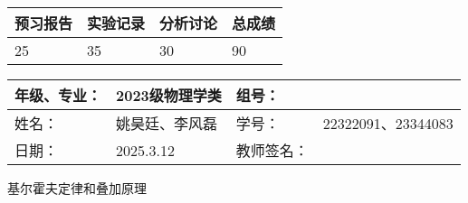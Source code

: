 \documentclass[dvipsnames, svgnames,a4paper,11pt]{article}
\newcommand{\exname}{基尔霍夫定律和叠加原理}%
\begin{document}
\begin{table}
	\renewcommand\arraystretch{1.7}
	\begin{tabularx}{\textwidth}{
		|X|X|X|X
		|X|X|X|X|}
	\hline
	\multicolumn{2}{|c|}{预习报告}&\multicolumn{2}{|c|}{实验记录}&\multicolumn{2}{|c|}{分析讨论}&\multicolumn{2}{|c|}{总成绩}\\
	\hline
	 \hspace{0.625cm}25& & \hspace{0.625cm}35  & & \hspace{0.625cm}30  & &  \hspace{0.625cm}90 & \\
	\hline
	\end{tabularx}
\end{table}


\begin{table}
	\renewcommand\arraystretch{1.7}
	\begin{tabularx}{\textwidth}{|X|X|X|X|}
	\hline
	年级、专业：& 2023级物理学类 &组号：& \\
	\hline
	姓名：& 姚昊廷、李风磊 & 学号：&22322091、23344083\\
	\hline
	日期：&2025.3.12  & 教师签名：& \\
	\hline
	\end{tabularx}
\end{table}

\begin{center}
	\LARGE \exname
\end{center}
\end{document}
